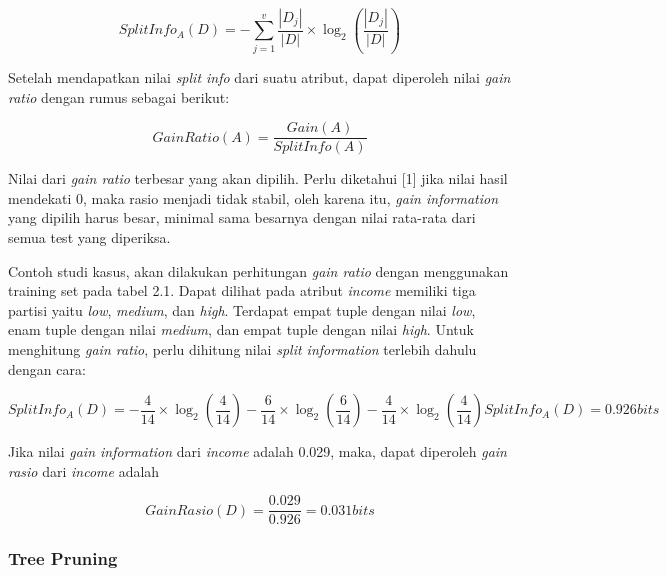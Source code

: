 \begin{displaymath}
	SplitInfo_A(D) = - \sum_{j=1}^v \frac{|D_j|}{|D|} \times \log_2 (\frac{|D_j|}{|D|})
\end{displaymath}

Setelah mendapatkan nilai \textsl{split info} dari suatu atribut, dapat diperoleh nilai \textsl{gain ratio} dengan rumus sebagai berikut:

\begin{displaymath}
	GainRatio(A) = \frac{Gain(A)}{SplitInfo(A)}
\end{displaymath}

Nilai dari \textsl{gain ratio} terbesar yang akan dipilih. Perlu diketahui [1] jika nilai hasil mendekati 0, maka rasio menjadi tidak stabil, oleh karena itu, \textsl{gain information} yang dipilih harus besar, minimal sama besarnya dengan nilai rata-rata dari semua test yang diperiksa.

Contoh studi kasus, akan dilakukan perhitungan \textsl{gain ratio} dengan menggunakan training set pada tabel 2.1. Dapat dilihat pada atribut \textsl{income} memiliki tiga partisi yaitu \textsl{low}, \textsl{medium}, dan \textsl{high}. Terdapat empat tuple dengan nilai \textsl{low}, enam tuple dengan nilai \textsl{medium}, dan empat tuple dengan nilai \textsl{high}. Untuk menghitung \textsl{gain ratio}, perlu dihitung nilai \textsl{split information} terlebih dahulu dengan cara:

\begin{displaymath}
	SplitInfo_A(D) = - \frac{4}{14} \times \log_2 (\frac{4}{14}) - \frac{6}{14} \times \log_2 (\frac{6}{14}) - \frac{4}{14} \times \log_2 (\frac{4}{14})
	SplitInfo_A(D) = 0.926 bits
\end{displaymath} 

Jika nilai \textsl{gain information} dari \textsl{income} adalah 0.029, maka, dapat diperoleh \textsl{gain rasio} dari \textsl{income} adalah

\begin{displaymath}
	GainRasio(D) = \frac{0.029}{0.926} = 0.031 bits
\end{displaymath}

\subsubsection{Tree Pruning}

